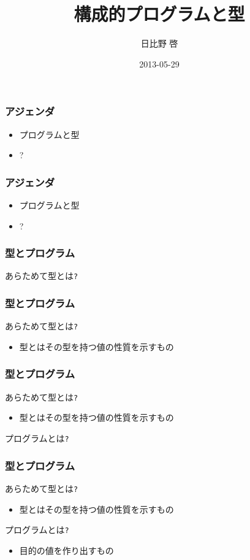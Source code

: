 \documentclass[cjk,dvipdfm,14pt]{beamer}
\title{構成的プログラムと型}
\author{日比野 啓}
\date{2013-05-29}
\begin{document}
\begin{frame}
\maketitle
\end{frame}

\begin{frame}[fragile]
\frametitle{アジェンダ}

\begin{itemize}
\item プログラムと型
\item ?
\end{itemize}

\end{frame}

\begin{frame}[fragile]
\frametitle{アジェンダ}

\begin{itemize}
\item { \color{red} プログラムと型 }
\item ?
\end{itemize}

\end{frame}

\begin{frame}[fragile]
\frametitle{型とプログラム}
あらためて型とは\verb|?|
\end{frame}

\begin{frame}[fragile]
\frametitle{型とプログラム}
あらためて型とは\verb|?|
\begin{itemize}
\item { \color{red} 型とはその型を持つ値の性質を示すもの }
\end{itemize}
\end{frame}

\begin{frame}[fragile]
\frametitle{型とプログラム}

あらためて型とは\verb|?|
\begin{itemize}
\item 型とはその型を持つ値の性質を示すもの
\end{itemize}

プログラムとは\verb|?|

\end{frame}

\begin{frame}[fragile]
\frametitle{型とプログラム}

あらためて型とは\verb|?|
\begin{itemize}
\item 型とはその型を持つ値の性質を示すもの
\end{itemize}

プログラムとは\verb|?|
\begin{itemize}
\item { \color{red} 目的の値を作り出すもの }
\end{itemize}

\end{frame}
\end{document}

